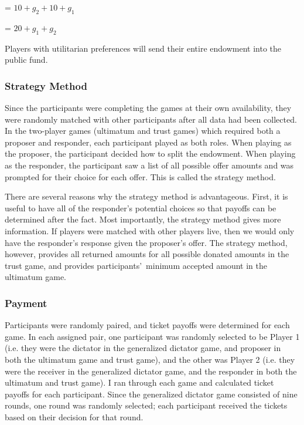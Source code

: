 \documentclass[12pt]{article}
\begin{document}
\hspace{4mm} = \(10 + g_{2} + 10 + g_{1}\)

\hspace{4mm} = \(20 + g_{1} + g_{2}\)

Players with utilitarian preferences will send their entire endowment into the public fund.


\subsubsection{Strategy Method}

Since the participants were completing the games at their own availability, they were randomly matched with other participants after all data had been collected. In the two-player games (ultimatum and trust games) which required both a proposer and responder, each participant played as both roles. When playing as the proposer, the participant decided how to split the endowment. When playing as the responder, the participant saw a list of all possible offer amounts and was prompted for their choice for each offer. This is called the strategy method.

There are several reasons why the strategy method is advantageous. First, it is useful to have all of the responder\rq s potential choices so that payoffs can be determined after the fact. Most importantly, the strategy method gives more information. If players were matched with other players live, then we would only have the responder\rq s response given the proposer\rq s offer. The strategy method, however, provides all returned amounts for all possible donated amounts in the trust game, and provides participants\rq \ minimum accepted amount in the ultimatum game. 

\subsubsection{Payment}

Participants were randomly paired, and ticket payoffs were determined for each game. In each assigned pair, one participant was randomly selected to be Player 1 (i.e. they were the dictator in the generalized dictator game, and proposer in both the ultimatum game and trust game), and the other was Player 2 (i.e. they were the receiver in the generalized dictator game, and the responder in both the ultimatum and trust game). I ran through each game and calculated ticket payoffs for each participant. Since the generalized dictator game consisted of nine rounds, one round was randomly selected; each participant received the tickets based on their decision for that round. 
\end{document}
